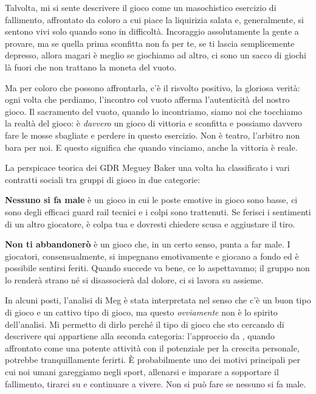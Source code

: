 Talvolta, mi si sente descrivere il gioco come un masochistico esercizio di fallimento, affrontato da coloro a cui piace la liquirizia salata e, generalmente, si sentono vivi solo quando sono in difficoltà. Incoraggio assolutamente la gente a provare, ma se quella prima sconfitta non fa per te, se ti lascia semplicemente depresso, allora magari è meglio se giochiamo ad altro, ci sono un sacco di giochi là fuori che non trattano la moneta del vuoto.

Ma per coloro che possono affrontarla, c'è il risvolto positivo, la gloriosa verità: ogni volta che perdiamo, l'incontro col vuoto afferma l'autenticità del nostro gioco. Il sacramento del vuoto, quando lo incontriamo, siamo noi che tocchiamo la realtà del gioco: è \textit{davvero} un gioco di vittoria e sconfitta e possiamo davvero fare le mosse sbagliate e perdere in questo esercizio. Non è teatro, l'arbitro non bara per noi. E questo significa che quando vinciamo, anche la vittoria è reale.


La perspicace teorica dei GDR Meguey Baker una volta ha classificato i vari contratti sociali tra gruppi di gioco in due categorie:

\textbf{Nessuno si fa male} è un gioco in cui le poste emotive in gioco sono basse, ci sono degli efficaci guard rail tecnici e i colpi sono trattenuti. Se ferisci i sentimenti di un altro giocatore, è colpa tua e dovresti chiedere scusa e aggiustare il tiro.

\textbf{Non ti abbandonerò} è un gioco che, in un certo senso, punta a far male. I giocatori, consensualmente, si impegnano emotivamente e giocano a fondo ed è possibile sentirsi feriti. Quando succede va bene, ce lo aspettavamo; il gruppo non lo renderà strano né si disassocierà dal dolore, ci si lavora su assieme.

In alcuni posti, l'analisi di Meg è stata interpretata nel senso che c'è un buon tipo di gioco e un cattivo tipo di gioco, ma questo \textit{ovviamente} non è lo spirito dell'analisi. Mi permetto di dirlo perché il tipo di gioco che sto cercando di descrivere qui appartiene alla seconda categoria: l'approccio da , quando affrontato come una potente attività con il potenziale per la crescita personale, potrebbe tranquillamente ferirti. È probabilmente uno dei motivi principali per cui noi umani gareggiamo negli sport, allenarsi e imparare a sopportare il fallimento, tirarci su e continuare a vivere. Non si può fare se nessuno si fa male.

